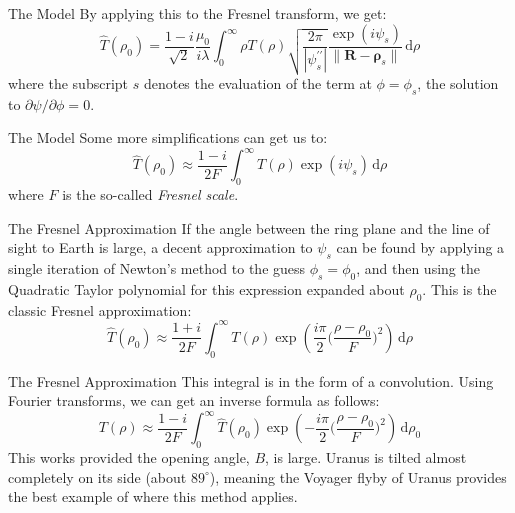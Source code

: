 \documentclass{beamer}
\begin{document}
    \begin{frame}{The Model}
        By applying this to the Fresnel transform, we get:
        \begin{equation}
            \hat{T}(\rho_{0})
            =
            \frac{1-i}{\sqrt{2}}\frac{\mu_{0}}{i\lambda}
            \int_{0}^{\infty}
                \rho
                T(\rho)
                \sqrt{\frac{2\pi}{|\psi^{\prime\prime}_{s}|}}
                \frac{\exp(i\psi_{s})}{\|\mathbf{R}-\boldsymbol{\rho}_{s}\|}\,
                \textrm{d}\rho
        \end{equation}
        where the subscript $s$ denotes the evaluation of the term at
        $\phi=\phi_{s}$, the solution to $\partial\psi/\partial\phi=0$.
    \end{frame}
    \begin{frame}{The Model}
        Some more simplifications can get us to:
        \begin{equation}
            \hat{T}(\rho_{0})
            \approx
            \frac{1-i}{2F}
            \int_{0}^{\infty}
                T(\rho)\exp(i\psi_{s})\,\textrm{d}\rho
        \end{equation}
        where $F$ is the so-called \textit{Fresnel scale}.
    \end{frame}
    \begin{frame}{The Fresnel Approximation}
        If the angle between the ring plane and the line of sight to Earth is
        large, a decent approximation to $\psi_{s}$ can be found by applying
        a single iteration of Newton's method to the guess $\phi_{s}=\phi_{0}$,
        and then using the Quadratic Taylor polynomial for this expression
        expanded about $\rho_{0}$. This is the classic Fresnel approximation:
        \begin{equation}
            \hat{T}(\rho_{0})
            \approx
            \frac{1+i}{2F}
            \int_{0}^{\infty}
                T(\rho)
                \exp\left(
                    \frac{i\pi}{2}\big(\frac{\rho-\rho_{0}}{F}\big)^{2}
                \right)\,\textrm{d}\rho
        \end{equation}
    \end{frame}
    \begin{frame}{The Fresnel Approximation}
        This integral is in the form of a convolution. Using Fourier transforms,
        we can get an inverse formula as follows:
        \begin{equation}
            T(\rho)
            \approx
            \frac{1-i}{2F}
            \int_{0}^{\infty}
                \hat{T}(\rho_{0})
                \exp\left(
                    -\frac{i\pi}{2}\big(\frac{\rho-\rho_{0}}{F}\big)^{2}
                \right)\,\textrm{d}\rho_{0}
        \end{equation}
        This works provided the opening angle, $B$, is large.
        Uranus is tilted almost completely on its side (about $89^{\circ}$),
        meaning the Voyager flyby of Uranus provides the best example of where
        this method applies.
    \end{frame}
\end{document}
